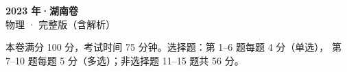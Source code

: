 \documentclass[zihao=-4, a4paper]{ctexart}
\begin{document}
\begin{center}
  {\Large\bfseries 2023 年·湖南卷}\\[4pt]
  {\large 物理 · 完整版（含解析）}
\end{center}
\medskip
\begin{gknotice}
  本卷满分 100 分，考试时间 75 分钟。选择题：第 1--6 题每题 4 分（单选），
  第 7--10 题每题 5 分（多选）；非选择题 11--15 题共 56 分。
\end{gknotice}

\clearpage
{}

\clearpage
{}

\end{document}
